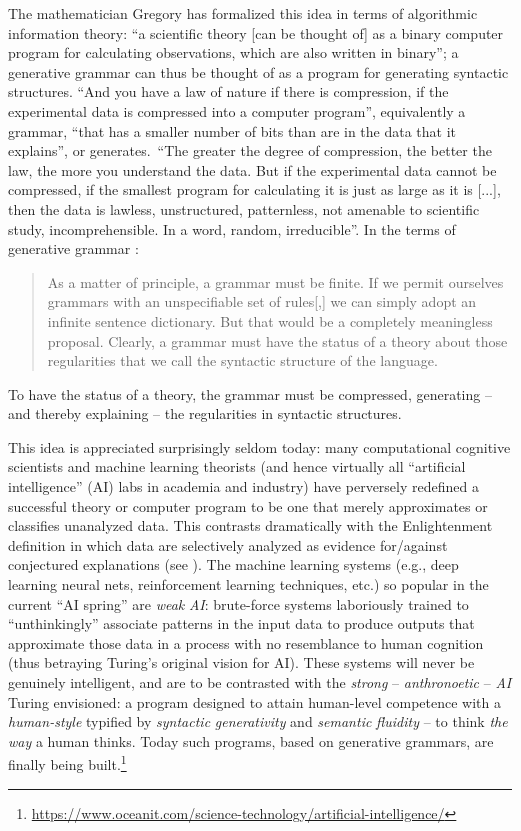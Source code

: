 \documentclass[output=paper]{langsci/langscibook}
\begin{document}
The mathematician Gregory \citet[64]{Chaitin2005} has formalized this idea in
terms of algorithmic information theory: {“a scientific theory [can
be thought of] as a binary computer program for calculating observations, which
are also written in binary”; a generative grammar can thus be thought of as a
program for generating syntactic structures.}{} {“And you have a
law of nature if there is compression, if the experimental data is compressed
into a computer program”, equivalently a grammar, “that has a smaller number of
bits than are in the data that it explains”, or generates.}{~“}{The
greater the degree of compression, the better the law, the more you understand
the data.} {But if the experimental data cannot be compressed, if
the smallest program for calculating it is just as large as it is [...], then
the data is lawless, unstructured, patternless, not amenable to scientific
study, incomprehensible.} In a word, random, irreducible”. In
the terms of generative grammar \parencite[285]{ChomskyMiller1963}: 
\begin{quote}As a matter of principle, a grammar must be finite. If we permit
ourselves grammars with an unspecifiable set of rules[,] we can simply adopt an
infinite sentence dictionary. But that would be a completely meaningless proposal. 
Clearly, a grammar must have the status of a theory about those regularities that 
we call the syntactic structure of the language.
\end{quote} 
To have the status of a theory, the grammar must be compressed,
generating -- and thereby explaining -- the regularities in syntactic structures.

This idea is appreciated surprisingly seldom today: many computational
cognitive scientists and machine learning theorists (and hence virtually all
“artificial intelligence” (AI) labs in academia and industry) have perversely
redefined a successful theory or computer program to be one that merely
approximates or classifies unanalyzed data. This contrasts dramatically with
the Enlightenment definition in which data are selectively analyzed as evidence
for\slash against conjectured explanations (see
\citealt{Popper1963,Chomsky2000,Deutsch2011}). The machine learning systems
(e.g., deep learning neural nets, reinforcement learning techniques, etc.) so
popular in the current “AI spring” are \emph{weak} \emph{AI}: brute-force
systems laboriously trained to “unthinkingly” associate patterns in the input
data to produce outputs that approximate those data in a process with no
resemblance to human cognition (thus betraying Turing’s original vision for
AI). These systems will never be genuinely intelligent, and are to be
contrasted with the \emph{strong} – \emph{anthronoetic} – \emph{AI} Turing
envisioned: a program designed to attain human-level competence with a
\emph{human-style} typified by \emph{syntactic} \emph{generativity} and
\emph{semantic} \emph{fluidity} – to think \emph{the} \emph{way} a human
thinks. Today such programs,  based on generative grammars, are finally being
built.\footnote{\url{https://www.oceanit.com/science-technology/artificial-intelligence/}}
\end{document}
